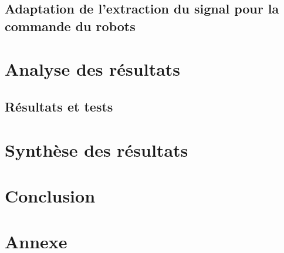 \documentclass[11pt]{article}
\begin{document}
\cleardoublepage

\subsection{Adaptation de l'extraction du signal pour la commande du robots}

\cleardoublepage

\subsubsection{} \label{Deep}

	
\subsubsection{}

\cleardoublepage


\section{Analyse des résultats}


\subsection{}

\subsection{Résultats et tests}

\cleardoublepage



\section{Synthèse des résultats}

\cleardoublepage


\section{Conclusion}
\cleardoublepage



\section{Annexe}


\cleardoublepage
\end{document}
